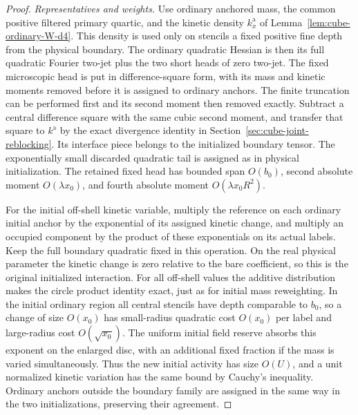\documentclass[11pt]{article}
\theoremstyle{definition}
\begin{document}
\begin{proof}
\emph{Representatives and weights.}
Use ordinary anchored mass, the common positive filtered primary
quartic, and the kinetic density \(k_x^{\mathrm a}\) of
Lemma~\ref{lem:cube-ordinary-W-d4}. This density is used only
on stencils a fixed positive fine depth from the physical boundary.
The ordinary quadratic Hessian is then its full quadratic
Fourier two-jet plus the two short heads of zero two-jet.
The fixed microscopic head is put in difference-square form,
with its mass and kinetic moments removed before it is assigned
to ordinary anchors. The finite truncation can be performed first
and its second moment then removed exactly. Subtract a central
difference square with the same cubic second moment, and transfer
that square to \(k^{\mathrm a}\) by the exact divergence identity
in Section~\ref{sec:cube-joint-reblocking}. Its interface piece
belongs to the initialized boundary tensor. The exponentially
small discarded quadratic tail is assigned as in physical
initialization. The retained fixed head has bounded span
\(O(b_0)\), second absolute moment \(O(\lambda x_0)\), and fourth
absolute moment \(O(\lambda x_0R^2)\).

For the initial off-shell kinetic variable, multiply the reference
on each ordinary initial anchor by the exponential of its assigned
kinetic change, and multiply an occupied component by the product
of these exponentials on its actual labels. Keep the full boundary
quadratic fixed in this operation. On the real physical parameter
the kinetic change is zero relative to the bare coefficient, so
this is the original initialized interaction. For all off-shell
values the additive distribution makes the circle product identity
exact, just as for initial mass reweighting. In the initial
ordinary region all central stencils have depth comparable to
\(b_0\), so a change of size \(O(x_0)\) has small-radius quadratic
cost \(O(x_0)\) per label and large-radius cost \(O(\sqrt{x_0})\).
The uniform initial field reserve absorbs this exponent on
the enlarged disc, with an additional fixed fraction if the
mass is varied simultaneously. Thus the new initial activity
has size \(O(U)\), and a unit normalized kinetic variation
has the same bound by Cauchy's inequality. Ordinary anchors
outside the boundary family are assigned in the same way in
the two initializations, preserving their agreement.


\end{proof}
\end{document}
